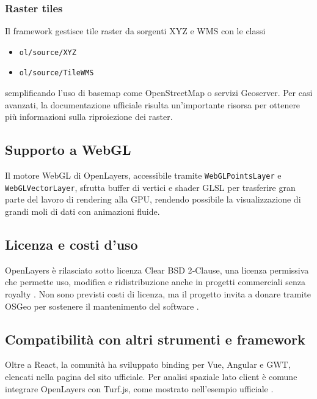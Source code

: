 \subsubsection*{Raster tiles}
Il framework gestisce tile raster da sorgenti XYZ e WMS con le classi 

\begin{itemize}
    \item \texttt{ol/source/XYZ} 
    \item \texttt{ol/source/TileWMS}
\end{itemize}

semplificando l'uso di basemap come OpenStreetMap o servizi Geoserver\cite{openlayers-raster-xyz}.  
Per casi avanzati, la documentazione ufficiale risulta un'importante risorsa per ottenere più informazioni sulla riproiezione dei raster.

\subsection{Supporto a WebGL}
Il motore WebGL di OpenLayers, accessibile tramite \texttt{WebGLPointsLayer} e \texttt{WebGLVectorLayer}, sfrutta buffer di vertici e shader GLSL per trasferire gran parte del lavoro di rendering alla GPU, rendendo possibile la visualizzazione di grandi moli di dati con animazioni fluide. \cite{openlayers-webgl-example,openlayers-webgl-workshop}

\subsection{Licenza e costi d'uso}
OpenLayers è rilasciato sotto licenza Clear BSD 2‑Clause, una licenza permissiva che permette uso, modifica e ridistribuzione anche in progetti commerciali senza royalty \cite{openlayers-github,ol-cesium-license}.  
Non sono previsti costi di licenza, ma il progetto invita a donare tramite OSGeo per sostenere il mantenimento del software \cite{openlayers-doc}.

\subsection{Compatibilità con altri strumenti e framework}
Oltre a React, la comunità ha sviluppato binding per Vue, Angular e GWT, elencati nella pagina  del sito ufficiale.  
Per analisi spaziale lato client è comune integrare OpenLayers con Turf.js, come mostrato nell'esempio ufficiale  \cite{awesome-openlayers,openlayers-turf-example}.  

\newpage